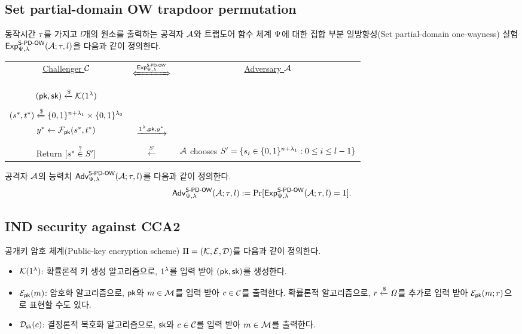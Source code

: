 \documentclass{article}
\theoremstyle{definition}
\begin{document}
\subsection{Set partial-domain OW trapdoor permutation}

동작시간 $\rt$를 가지고 $l$개의 원소를 출력하는 공격자 $\adv$와 트랩도어 함수
체계 $\tdsch$에 대한 집합 부분 일방향성(Set partial-domain one-wayness) 실험
$\Exp^{\owpds}_{\tdsch, \sp}(\adv; \rt, l)$을 다음과 같이 정의한다.
\begin{tcolorbox}[colback=white]
	\centering
	\begin{tabularx}{\linewidth}{CcC}
		\underline{Challenger $\ch$} & $\xLeftrightarrow{\Exp^{\owpds}_{\tdsch, \sp}}$ & \underline{Adversary $\adv$} \\
		\\
		$(\pk, \sk) \rgets \genkey(1^{\sp})$ & & \\
		\\
		$(s^*, t^*) \rgets \set{0, 1}^{\mlen + \sp_1} \times \set{0, 1}^{\sp_0}$ \\ $y^* \gets \td_{\pk}(s^*, t^*)$ & $\xrightarrow{1^{\sp}, \pk, y^*}$ & \\
		\\
		Return $[s^* \isin S']$ & $\xleftarrow{S'}$ & $\adv$ chooses $S' = \set{s_i \in \set{0, 1}^{\mlen + \sp_1}: 0 \le i \le l-1}$ \\
  \end{tabularx}
\end{tcolorbox}

공격자 $\adv$의 능력치 $\Adv^{\owpds}_{\tdsch, \sp}(\adv; \rt, l)$를 다음과 같이 정의한다.
$$
	\Adv^{\owpds}_{\tdsch, \sp}(\adv; \rt, l) := \Pr[\Exp^{\owpds}_{\tdsch, \sp}(\adv; \rt, l) = 1].
$$

\subsection{IND security against CCA2}

공개키 암호
체계(Public-key encryption scheme) $\sch = (\genkey, \enc, \dec)$를 다음과 같이
정의한다.
\begin{itemize}
	\item $\genkey(1^{\sp})$: 확률론적 키 생성 알고리즘으로, $1^{\sp}$를 입력
	받아 $(\pk, \sk)$를 생성한다.
	\item $\enc_{\pk}(\msg)$: 암호화 알고리즘으로, $\pk$와 $\msg \in
	\msgspace$를 입력 받아 $\ct \in \ctspace$를 출력한다. 확률론적 알고리즘으로,
	$\coin \rgets \coinspace$를 추가로 입력 받아 $\enc_{\pk}(\msg; \coin)$으로
	표현할 수도 있다.
	\item $\dec_{\sk}(\ct)$: 결정론적 복호화 알고리즘으로, $\sk$와 $\ct \in
	\ctspace$를 입력 받아 $\msg \in \msgspace$를 출력한다.
\end{itemize}
\end{document}
